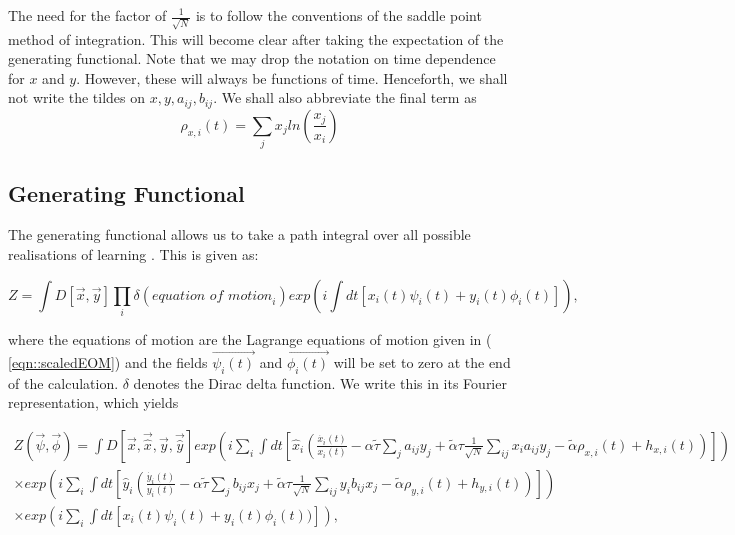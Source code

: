 \documentclass{article}
\begin{document}
	The need for the factor of $\frac{1}{\sqrt{N}}$ is to follow
        the conventions of the saddle point method of
        integration. This will become clear after taking the
        expectation of the generating functional. Note that we may
        drop the notation on time dependence for $x$ and $y$. However,
        these will always be functions of time. Henceforth, we shall
        not write the tildes on $x, y, a_{ij}, b_{ij}$. We shall also
        abbreviate the final term as
%
	\begin{equation*}
		\rho_{x, i}(t) = \sum_j x_j ln(\frac{x_j}{x_i}) 
	\end{equation*}


	\subsection{Generating Functional} %
	\label{sub:generating_functional}
	
	The generating functional allows us to take a path integral over all possible realisations of
	learning \cite{SpinGlassTheory}. This is given as:

	\begin{equation}
		Z = \int D[\Vec{x}, \Vec{y}] \prod_i \delta(\textit{equation of motion}_i) exp(i
		\int dt[x_i(t) \psi_i(t) + y_i(t) \phi_i(t)]), 
	\end{equation}

	where the equations of motion are the Lagrange equations of motion given in (
	\ref{eqn::scaledEOM}) and
	the fields $\Vec{\psi_i(t)}$ and $\Vec{\phi_i(t)}$ will be set to zero at the end of the
	calculation. $\delta$ denotes the Dirac delta function. We write this in its Fourier
	representation, which yields	

	\begin{equation}
		\begin{split}
	\label{eqn::generatingfunctional}
		Z(\Vec{\psi}, \Vec{\phi}) = \int D[\Vec{x}, \Vec{\hat{x}}, \Vec{y}, \Vec{\hat{y}}] exp(i \sum_i \int dt[\hat{x}_i
		(\frac{\dot{x_i}(t)}{x_i(t)} - \alpha \tilde{\tau} \sum_{j} a_
			{ij} 
			y_j +
			\tilde{\alpha} \tau \frac{1}{\sqrt{N}} \sum_{i j} x_i a_{ij} y_j
			- \tilde{\alpha} \rho_{x, i}(t) + h_{x, i}(t))]) 
			\\
			\times exp(i \sum_i \int dt[\hat{y}_i
		(\frac{\dot{y_i}(t)}{y_i(t)} - \alpha \tilde{\tau} \sum_{j} b_
			{ij} 
			x_j +
			\tilde{\alpha} \tau \frac{1}{\sqrt{N}} \sum_{i j} y_i b_{ij} x_j
			- \tilde{\alpha} \rho_{y, i}(t)+ h_{y, i}(t))])\\
			\times exp(i \sum_i
		\int dt[x_i(t) \psi_i(t) + y_i(t) \phi_i(t))]),
	\end{split}
	\end{equation}
\end{document}
